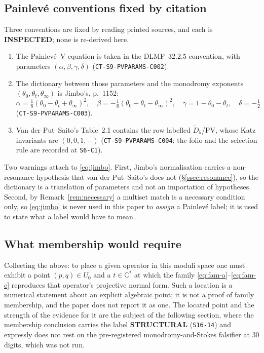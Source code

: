 \subsection{Painlev\'e conventions fixed by citation}\label{ssec:conventions}

Three conventions are fixed by reading printed sources, and each is
\textbf{INSPECTED}; none is re-derived here.

\begin{enumerate}
  \item The Painlev\'e~V equation is taken in the DLMF~32.2.5 convention, with
        parameters $(\alpha,\beta,\gamma,\delta)$
        (\texttt{CT-S9-PVPARAMS-C002}).
  \item The dictionary between those parameters and the monodromy exponents
        $(\theta_0,\theta_t,\theta_\infty)$ is Jimbo's, p.~1152:
        \begin{equation}\label{eq:jimbo}
          \alpha=\tfrac18(\theta_0-\theta_t+\theta_\infty)^2,\quad
          \beta=-\tfrac18(\theta_0-\theta_t-\theta_\infty)^2,\quad
          \gamma=1-\theta_0-\theta_t,\quad
          \delta=-\tfrac12
        \end{equation}
        (\texttt{CT-S9-PVPARAMS-C003}).
  \item Van der Put--Saito's Table~2.1 contains the row labelled
        $\widetilde D_5$/PV, whose Katz invariants are $(0,0,1,-)$
        (\texttt{CT-S9-PVPARAMS-C004}; the folio and the selection rule are
        recorded at \texttt{S6-C1}).
\end{enumerate}

Two warnings attach to \eqref{eq:jimbo}. First, Jimbo's normalisation carries a
non-resonance hypothesis that van der Put--Saito's does not
(\S\ref{ssec:resonance}), so the dictionary is a translation of parameters and
not an importation of hypotheses. Second, by
Remark~\ref{rem:necessary} a multiset match is a necessary condition only, so
\eqref{eq:jimbo} is never used in this paper to \emph{assign} a Painlev\'e
label; it is used to state what a label would have to mean.

\subsection{What membership would require}\label{ssec:membership}

Collecting the above: to place a given operator in this moduli space one must
exhibit a point $(p,q)\in U_0$ and a $t\in\mathbb C^{*}$ at which the family
\eqref{eq:fam-a}--\eqref{eq:fam-c} reproduces that operator's projective normal
form. Such a location is a numerical statement about an explicit algebraic
point; it is not a proof of family membership, and the paper does not report it
as one. The located point and the strength of the evidence for it are the
subject of the following section, where the membership conclusion carries the
label \textbf{STRUCTURAL} (\texttt{S16-14}) and expressly does not rest on the
pre-registered monodromy-and-Stokes falsifier at $30$ digits, which was not
run.

